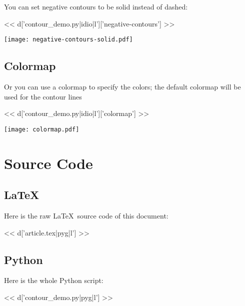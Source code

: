 You can set negative contours to be solid instead of dashed:

<< d['contour_demo.py|idio|l']['negative-contours'] >>

\texttt{[image: negative-contours-solid.pdf]}

\subsection{Colormap}

Or you can use a colormap to specify the colors; the default
colormap will be used for the contour lines

<< d['contour_demo.py|idio|l']['colormap'] >>

\texttt{[image: colormap.pdf]}

\section{Source Code}

\subsection{LaTeX}

Here is the raw \LaTeX\ source code of this document:

<< d['article.tex|pyg|l'] >>

\subsection{Python}

Here is the whole Python script:

<< d['contour_demo.py|pyg|l'] >>

